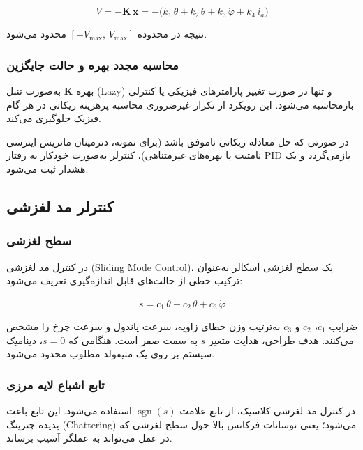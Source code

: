 \begin{equation}
V = -\mathbf{K}\,\mathbf{x}
= -\big(k_1\,\theta + k_2\,\dot{\theta} + k_3\,\dot{\varphi} + k_4\, i_a\big)
\end{equation}

نتیجه در محدوده $[-V_{\max},\, V_{\max}]$ محدود می‌شود.

\subsubsection{محاسبه مجدد بهره و حالت جایگزین}

بهره $\mathbf{K}$ به‌صورت تنبل (Lazy) و تنها در صورت تغییر پارامترهای فیزیکی یا کنترلی بازمحاسبه می‌شود. این رویکرد از تکرار غیرضروری محاسبه پرهزینه ریکاتی در هر گام فیزیک جلوگیری می‌کند.

در صورتی که حل معادله ریکاتی ناموفق باشد (برای نمونه، دترمینان ماتریس اینرسی نامثبت یا بهره‌های غیرمتناهی)، کنترلر به‌صورت خودکار به رفتار PID بازمی‌گردد و یک هشدار ثبت می‌شود.

\subsection{کنترلر مد لغزشی}

\subsubsection{سطح لغزشی}

در کنترل مد لغزشی (Sliding Mode Control)، یک سطح لغزشی اسکالر به‌عنوان ترکیب خطی از حالت‌های قابل اندازه‌گیری تعریف می‌شود:

\begin{equation}
s = c_1\,\theta + c_2\,\dot{\theta} + c_3\,\dot{\varphi}
\end{equation}

ضرایب $c_1$، $c_2$ و $c_3$ به‌ترتیب وزن خطای زاویه، سرعت پاندول و سرعت چرخ را مشخص می‌کنند. هدف طراحی، هدایت متغیر $s$ به سمت صفر است. هنگامی که $s = 0$، دینامیک سیستم بر روی یک منیفولد مطلوب محدود می‌شود.

\subsubsection{تابع اشباع لایه مرزی}

در کنترل مد لغزشی کلاسیک، از تابع علامت $\operatorname{sgn}(s)$ استفاده می‌شود. این تابع باعث پدیده چترینگ (Chattering) می‌شود؛ یعنی نوسانات فرکانس بالا حول سطح لغزشی که در عمل می‌تواند به عملگر آسیب برساند.

